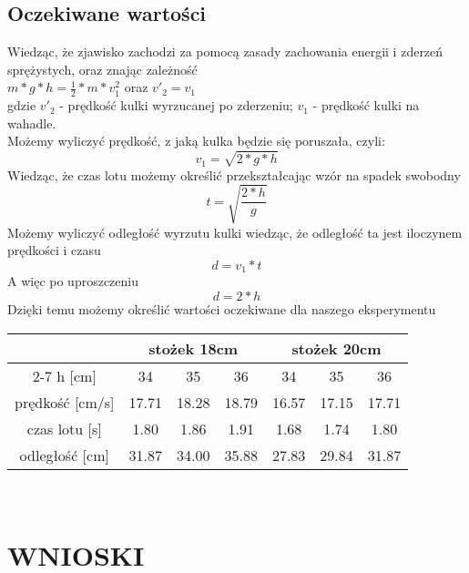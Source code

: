 \documentclass{article}
\begin{document}
\subsection*{Oczekiwane wartości}
{Wiedząc, że zjawisko zachodzi za pomocą zasady zachowania energii i zderzeń sprężystych, oraz znając zależność \\
$m*g*h = \frac{1}{2}*m*v_{1}^{2}$
oraz
$v'_{2} = v_{1}$ \\
gdzie $v'_{2}$ - prędkość kulki wyrzucanej po zderzeniu; $v_{1}$ - prędkość kulki na wahadle. \\
Możemy wyliczyć prędkość, z jaką kulka będzie się poruszała, czyli:
\[v_{1}=\sqrt{2*g*h}\]
Wiedząc, że czas lotu możemy określić przekształcając wzór na spadek swobodny
\[t=\sqrt{\frac{2*h}{g}}\]
Możemy wyliczyć odległość wyrzutu kulki wiedząc, że odległość ta jest iloczynem prędkości i czasu
\[d = v_1*t\]
A więc po uproszczeniu
\[d=2*h\]
Dzięki temu możemy określić wartości oczekiwane dla naszego eksperymentu \\
\begin{tabular}{|c|c|c|c|c|c|c|}
\hline
\multirow{2}{*}{} & \multicolumn{3}{c|}{stożek 18cm} & \multicolumn{3}{c|}{stożek 20cm} \\
\cline{2-7}
h [cm] & 34 & 35 & 36 & 34 & 35 & 36 \\ \hline
prędkość [cm/s] & 17.71 & 18.28 & 18.79 & 16.57 & 17.15 & 17.71 \\ \hline
czas lotu [s] & 1.80 & 1.86 & 1.91 & 1.68 & 1.74 & 1.80 \\ \hline
odległość [cm] & 31.87 & 34.00 & 35.88 & 27.83 & 29.84 & 31.87 \\ \hline
\end{tabular} \\
}


\section*{WNIOSKI}
\end{document}
